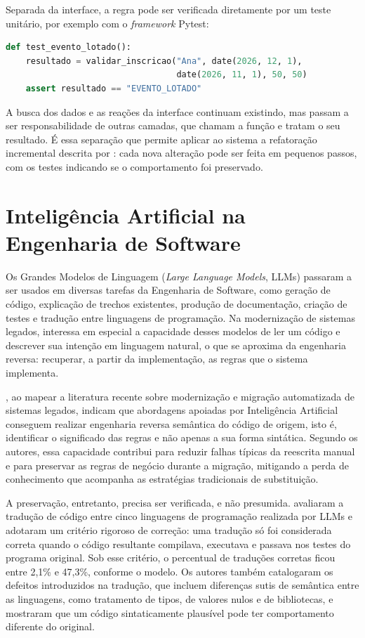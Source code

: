 Separada da interface, a regra pode ser verificada diretamente por um teste unitário, por exemplo com o \textit{framework} Pytest:

\begin{lstlisting}[language=Python,basicstyle=\ttfamily\small,frame=single,breaklines=true]
def test_evento_lotado():
    resultado = validar_inscricao("Ana", date(2026, 12, 1),
                                  date(2026, 11, 1), 50, 50)
    assert resultado == "EVENTO_LOTADO"
\end{lstlisting}

A busca dos dados e as reações da interface continuam existindo, mas passam a ser responsabilidade de outras camadas, que chamam a função e tratam o seu resultado. É essa separação que permite aplicar ao sistema a refatoração incremental descrita por : cada nova alteração pode ser feita em pequenos passos, com os testes indicando se o comportamento foi preservado.

\section{Inteligência Artificial na Engenharia de Software}
\label{sec:ia}

Os Grandes Modelos de Linguagem (\textit{Large Language Models}, LLMs) passaram a ser usados em diversas tarefas da Engenharia de Software, como geração de código, explicação de trechos existentes, produção de documentação, criação de testes e tradução entre linguagens de programação. Na modernização de sistemas legados, interessa em especial a capacidade desses modelos de ler um código e descrever sua intenção em linguagem natural, o que se aproxima da engenharia reversa: recuperar, a partir da implementação, as regras que o sistema implementa.

, ao mapear a literatura recente sobre modernização e migração automatizada de sistemas legados, indicam que abordagens apoiadas por Inteligência Artificial conseguem realizar engenharia reversa semântica do código de origem, isto é, identificar o significado das regras e não apenas a sua forma sintática. Segundo os autores, essa capacidade contribui para reduzir falhas típicas da reescrita manual e para preservar as regras de negócio durante a migração, mitigando a perda de conhecimento que acompanha as estratégias tradicionais de substituição.

A preservação, entretanto, precisa ser verificada, e não presumida.  avaliaram a tradução de código entre cinco linguagens de programação realizada por LLMs e adotaram um critério rigoroso de correção: uma tradução só foi considerada correta quando o código resultante compilava, executava e passava nos testes do programa original. Sob esse critério, o percentual de traduções corretas ficou entre 2,1\% e 47,3\%, conforme o modelo. Os autores também catalogaram os defeitos introduzidos na tradução, que incluem diferenças sutis de semântica entre as linguagens, como tratamento de tipos, de valores nulos e de bibliotecas, e mostraram que um código sintaticamente plausível pode ter comportamento diferente do original.

